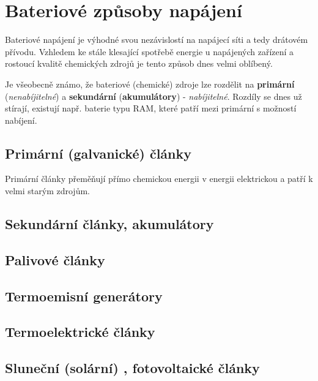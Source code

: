   \section{Bateriové způsoby napájení}
    Bateriové napájení je výhodné svou nezávislostí na napájecí síti a tedy drátovém přívodu. 
    Vzhledem ke stále klesající spotřebě energie u napájených zařízení a rostoucí kvalitě 
    chemických zdrojů je tento způsob dnes velmi oblíbený.
   
    Je všeobecně známo, že bateriové (chemické) zdroje lze rozdělit na \textbf{primární} 
    (\emph{nenabíjitelné}) a \textbf{sekundární} (\textbf{a\-ku\-mu\-lá\-to\-ry}) - 
    \emph{nabíjitelné}. Rozdíly se dnes už stírají, existují např. baterie typu RAM,  které patří 
    mezi primární s možností nabíjení.
    
    \subsection{Primární (galvanické) články}
      Primární články přeměňují přímo chemickou energii v energii elektrickou a patří k velmi 
      starým zdrojům.
    \subsection{Sekundární články, akumulátory}
    \subsection{Palivové články}
    \subsection{Termoemisní generátory}
    \subsection{Termoelektrické články}
    \subsection{Sluneční (solární) , fotovoltaické články}
    
